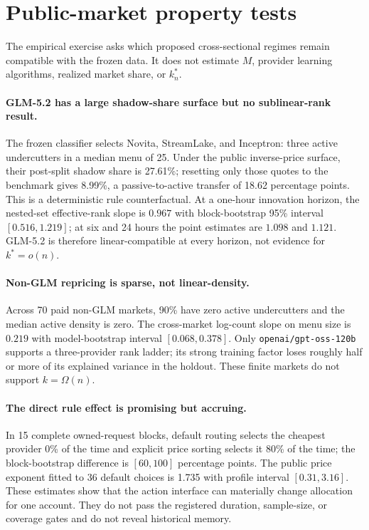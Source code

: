 \documentclass[10pt,twocolumn]{article}
\begin{document}
\section{Public-market property tests}

The empirical exercise asks which proposed cross-sectional regimes remain
compatible with the frozen data.  It does not estimate $M$, provider learning
algorithms, realized market share, or $k_n^*$.

\paragraph{GLM-5.2 has a large shadow-share surface but no sublinear-rank
result.}
The frozen classifier selects Novita, StreamLake, and Inceptron: three active
undercutters in a median menu of 25.  Under the public inverse-price surface,
their post-split shadow share is 27.61\%; resetting only those quotes to the
benchmark gives 8.99\%, a passive-to-active transfer of 18.62 percentage
points.  This is a deterministic rule counterfactual.  At a one-hour innovation
horizon, the nested-set effective-rank slope is $0.967$ with block-bootstrap
95\% interval $[0.516,1.219]$; at six and 24 hours the point estimates are
$1.098$ and $1.121$.  GLM-5.2 is therefore linear-compatible at every horizon,
not evidence for $k^*=o(n)$.

\paragraph{Non-GLM repricing is sparse, not linear-density.}
Across 70 paid non-GLM markets, 90\% have zero active undercutters and the median
active density is zero.  The cross-market log-count slope on menu size is
$0.219$ with model-bootstrap interval $[0.068,0.378]$.  Only
\texttt{openai/gpt-oss-120b} supports a three-provider rank ladder; its strong
training factor loses roughly half or more of its explained variance in the
holdout.  These finite markets do not support $k=\Omega(n)$.

\paragraph{The direct rule effect is promising but accruing.}
In 15 complete owned-request blocks, default routing selects the cheapest
provider 0\% of the time and explicit price sorting selects it 80\% of the time;
the block-bootstrap difference is $[60,100]$ percentage points.  The public
price exponent fitted to 36 default choices is 1.735 with profile interval
$[0.31,3.16]$.  These estimates show that the action interface can materially
change allocation for one account.  They do not pass the registered duration,
sample-size, or coverage gates and do not reveal historical memory.
\end{document}

